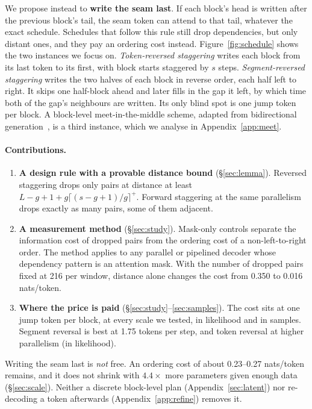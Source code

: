 \documentclass[11pt]{article}
\theoremstyle{definition}
\theoremstyle{remark}
\begin{document}
We propose instead to \textbf{write the seam last}.
If each block's head is written after the previous block's tail, the seam token can attend to that tail, whatever the exact schedule.
Schedules that follow this rule still drop dependencies, but only distant ones, and they pay an ordering cost instead.
Figure~\ref{fig:schedule} shows the two instances we focus on.
\emph{Token-reversed staggering} writes each block from its last token to its first, with block starts staggered by $s$ steps.
\emph{Segment-reversed staggering} writes the two halves of each block in reverse order, each half left to right.
It skips one half-block ahead and later fills in the gap it left, by which time both of the gap's neighbours are written.
Its only blind spot is one jump token per block.
A block-level meet-in-the-middle scheme, adapted from bidirectional generation~\citep{zhou2019bothsides,zhou2019sbnmt,zhang2020interleaved}, is a third instance, which we analyse in Appendix~\ref{app:meet}.

\paragraph{Contributions.}
\begin{enumerate}
  \item \textbf{A design rule with a provable distance bound} (\S\ref{sec:lemma}). Reversed staggering drops only pairs at distance at least $L-g+1+g\lceil (s-g+1)/g\rceil^{+}$. Forward staggering at the same parallelism drops exactly as many pairs, some of them adjacent.
  \item \textbf{A measurement method} (\S\ref{sec:study}). Mask-only controls separate the information cost of dropped pairs from the ordering cost of a non-left-to-right order. The method applies to any parallel or pipelined decoder whose dependency pattern is an attention mask. With the number of dropped pairs fixed at 216 per window, distance alone changes the cost from 0.350 to 0.016 nats/token.
  \item \textbf{Where the price is paid} (\S\ref{sec:study}--\ref{sec:samples}). The cost sits at one jump token per block, at every scale we tested, in likelihood and in samples. Segment reversal is best at 1.75 tokens per step, and token reversal at higher parallelism (in likelihood).
\end{enumerate}
Writing the seam last is \emph{not} free.
An ordering cost of about 0.23--0.27 nats/token remains, and it does not shrink with $4.4\times$ more parameters given enough data (\S\ref{sec:scale}).
Neither a discrete block-level plan (Appendix~\ref{sec:latent}) nor re-decoding a token afterwards (Appendix~\ref{app:refine}) removes it.
\end{document}
